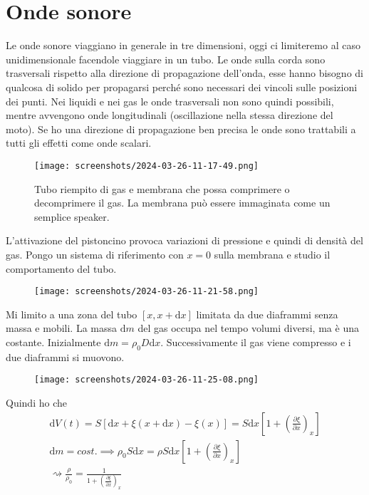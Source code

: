 \section{Onde sonore}


Le onde sonore viaggiano in generale in tre dimensioni, oggi ci limiteremo al caso unidimensionale facendole viaggiare in un tubo. Le onde sulla corda sono trasversali rispetto alla direzione di propagazione dell'onda, esse hanno bisogno di qualcosa di solido per propagarsi perché sono necessari dei vincoli sulle posizioni dei punti. Nei liquidi e nei gas le onde trasversali non sono quindi possibili, mentre avvengono onde longitudinali (oscillazione nella stessa direzione del moto).
Se ho una direzione di propagazione ben precisa le onde sono trattabili a tutti gli effetti come onde scalari.
\begin{figure}[H]
	\centering
	\texttt{[image: screenshots/2024-03-26-11-17-49.png]}
	\caption{Tubo riempito di gas e membrana che possa comprimere o decomprimere il gas. La membrana può essere immaginata come un semplice speaker.}
\end{figure}
L'attivazione del pistoncino provoca variazioni di pressione e quindi di densità del gas. Pongo un sistema di riferimento con \(x=0\) sulla membrana e studio il comportamento del tubo.
\begin{figure}[H]
	\centering
	\texttt{[image: screenshots/2024-03-26-11-21-58.png]}
\end{figure}
Mi limito a una zona del tubo \([x, x+ \mathrm{d} x]\) limitata da due diaframmi senza massa e mobili. La massa \(\mathrm{d} m\) del gas occupa nel tempo volumi diversi, ma è una costante. Inizialmente \(\mathrm{d} m = \rho _0 D \mathrm{d} x\). Successivamente il gas viene compresso e i due diaframmi si muovono.
\begin{figure}[H]
	\centering
	\texttt{[image: screenshots/2024-03-26-11-25-08.png]}
\end{figure}
Quindi ho che
\begin{gather}
	\mathrm{d} V(t) = S [\mathrm{d} x + \xi (x + \mathrm{d} x) - \xi (x)]=S \mathrm{d} x \left[ 1 + \left( \frac{\partial \xi }{\partial x}  \right)_x  \right]\\
	\mathrm{d} m = cost. \implies \rho _0 S \mathrm{d} x = \rho S \mathrm{d} x \left[ 1+ \left( \frac{\partial \xi }{\partial x}  \right)_x \right]\\
	\rightsquigarrow \frac{\rho}{\rho _0} = \frac{1}{1+ \left( \frac{\partial \xi }{\partial x}  \right)_x}
\end{gather}
